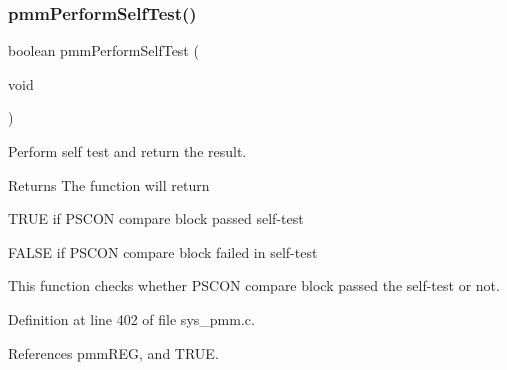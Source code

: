 \subsubsection{\texorpdfstring{pmm\+Perform\+Self\+Test()}{pmmPerformSelfTest()}}
{\footnotesize\ttfamily boolean pmm\+Perform\+Self\+Test (\begin{DoxyParamCaption}\item[{void}]{ }\end{DoxyParamCaption})}



Perform self test and return the result. 

\begin{DoxyReturn}{Returns}
The function will return
\begin{DoxyItemize}
\item T\+R\+UE if P\+S\+C\+ON compare block passed self-\/test
\item F\+A\+L\+SE if P\+S\+C\+ON compare block failed in self-\/test
\end{DoxyItemize}
\end{DoxyReturn}
This function checks whether P\+S\+C\+ON compare block passed the self-\/test or not. 

Definition at line 402 of file sys\+\_\+pmm.\+c.



References pmm\+R\+EG, and T\+R\+UE.


